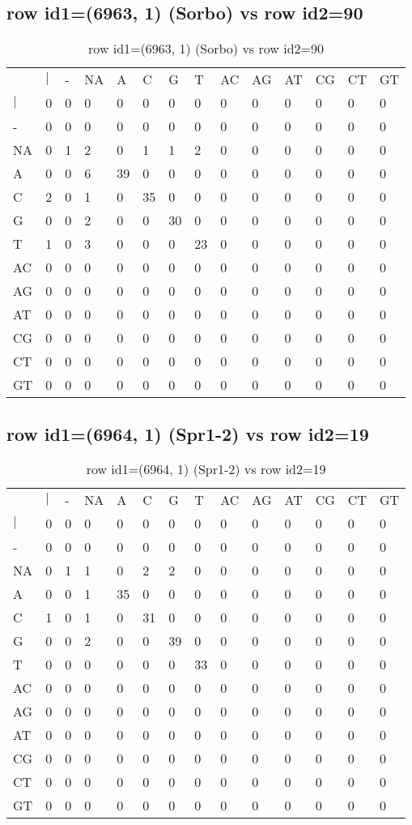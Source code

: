 \subsection{row id1=(6963, 1) (Sorbo) vs row id2=90}
\begin{center}
\begin{longtable}{|l|l|l|l|l|l|l|l|l|l|l|l|l|l|}
\caption{row id1=(6963, 1) (Sorbo) vs row id2=90} \label{table_dm168}\\
\hline
\\
\hline
&$|$&-&NA&A&C&G&T&AC&AG&AT&CG&CT&GT\\
$|$&0&0&0&0&0&0&0&0&0&0&0&0&0\\
-&0&0&0&0&0&0&0&0&0&0&0&0&0\\
NA&0&1&2&0&1&1&2&0&0&0&0&0&0\\
A&0&0&6&39&0&0&0&0&0&0&0&0&0\\
C&2&0&1&0&35&0&0&0&0&0&0&0&0\\
G&0&0&2&0&0&30&0&0&0&0&0&0&0\\
T&1&0&3&0&0&0&23&0&0&0&0&0&0\\
AC&0&0&0&0&0&0&0&0&0&0&0&0&0\\
AG&0&0&0&0&0&0&0&0&0&0&0&0&0\\
AT&0&0&0&0&0&0&0&0&0&0&0&0&0\\
CG&0&0&0&0&0&0&0&0&0&0&0&0&0\\
CT&0&0&0&0&0&0&0&0&0&0&0&0&0\\
GT&0&0&0&0&0&0&0&0&0&0&0&0&0\\
\hline
\end{longtable}
\end{center}

\subsection{row id1=(6964, 1) (Spr1-2) vs row id2=19}
\begin{center}
\begin{longtable}{|l|l|l|l|l|l|l|l|l|l|l|l|l|l|}
\caption{row id1=(6964, 1) (Spr1-2) vs row id2=19} \label{table_dm170}\\
\hline
\\
\hline
&$|$&-&NA&A&C&G&T&AC&AG&AT&CG&CT&GT\\
$|$&0&0&0&0&0&0&0&0&0&0&0&0&0\\
-&0&0&0&0&0&0&0&0&0&0&0&0&0\\
NA&0&1&1&0&2&2&0&0&0&0&0&0&0\\
A&0&0&1&35&0&0&0&0&0&0&0&0&0\\
C&1&0&1&0&31&0&0&0&0&0&0&0&0\\
G&0&0&2&0&0&39&0&0&0&0&0&0&0\\
T&0&0&0&0&0&0&33&0&0&0&0&0&0\\
AC&0&0&0&0&0&0&0&0&0&0&0&0&0\\
AG&0&0&0&0&0&0&0&0&0&0&0&0&0\\
AT&0&0&0&0&0&0&0&0&0&0&0&0&0\\
CG&0&0&0&0&0&0&0&0&0&0&0&0&0\\
CT&0&0&0&0&0&0&0&0&0&0&0&0&0\\
GT&0&0&0&0&0&0&0&0&0&0&0&0&0\\
\hline
\end{longtable}
\end{center}

